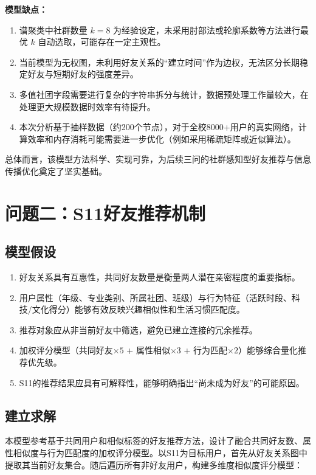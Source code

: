 \documentclass[a4paper,12pt]{ctexart}
\begin{document}
\textbf{模型缺点：}

\begin{enumerate}
    \item 谱聚类中社群数量 $k=8$ 为经验设定，未采用肘部法或轮廓系数等方法进行最优 $k$ 自动选取，可能存在一定主观性。
    \item 当前模型为无权图，未利用好友关系的“建立时间”作为边权，无法区分长期稳定好友与短期好友的强度差异。
    \item 多值社团字段需要进行复杂的字符串拆分与统计，数据预处理工作量较大，在处理更大规模数据时效率有待提升。
    \item 本次分析基于抽样数据（约200个节点），对于全校8000+用户的真实网络，计算效率和内存消耗可能需要进一步优化（例如采用稀疏矩阵或近似算法）。
\end{enumerate}

总体而言，该模型方法科学、实现可靠，为后续三问的社群感知型好友推荐与信息传播优化奠定了坚实基础。


\section{问题二：S11好友推荐机制}
\subsection{模型假设}
\begin{enumerate}
    \item 好友关系具有互惠性，共同好友数量是衡量两人潜在亲密程度的重要指标。
    \item 用户属性（年级、专业类别、所属社团、班级）与行为特征（活跃时段、科技/文化得分）能够有效反映兴趣相似性和生活习惯匹配度。
    \item 推荐对象应从非当前好友中筛选，避免已建立连接的冗余推荐。
    \item 加权评分模型（共同好友$\times5$ + 属性相似$\times3$ + 行为匹配$\times2$）能够综合量化推荐优先级。
    \item S11的推荐结果应具有可解释性，能够明确指出“尚未成为好友”的可能原因。
\end{enumerate}

\subsection{建立求解}
本模型参考基于共同用户和相似标签的好友推荐方法\cite{ref2}，设计了融合共同好友数、属性相似度与行为匹配度的加权评分模型。以S11为目标用户，首先从好友关系图中提取其当前好友集合。随后遍历所有非好友用户，构建多维度相似度评分模型：
\end{document}

